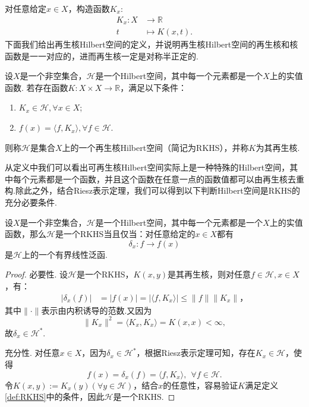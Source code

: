 \documentclass[../master.tex]{subfiles}
\begin{document}
对任意给定$x\in X$，构造函数$K_x$:
\begin{equation}\label{def:k_x}
    \begin{aligned}
K_x:X & \to\mathbb{R} \\
t & \mapsto K(x,t).
\end{aligned}
\end{equation}
下面我们给出再生核Hilbert空间的定义，并说明再生核Hilbert空间的再生核和核函数是一一对应的，进而再生核一定是对称半正定的.
\begin{definition}[再生核Hilbert空间]\label{def:RKHS}
    设$X$是一个非空集合，$\mathcal{H}$是一个Hilbert空间，其中每一个元素都是一个$X$上的实值函数. 若存在函数$K:X\times X\to\mathbb{R}$，满足以下条件：
    \begin{enumerate}
        \item $K_x\in\mathcal{H},\forall x\in X$;
        \item $f(x)=\langle f,K_x\rangle,\forall f\in\mathcal{H}$.
    \end{enumerate}
    则称$\mathcal{H}$是集合$X$上的一个再生核Hilbert空间（简记为RKHS），并称$K$为其再生核.
\end{definition}

从定义中我们可以看出可再生核Hilbert空间实际上是一种特殊的Hilbert空间，其中每个元素都是一个函数，并且这个函数在任意一点的函数值都可以由再生核去重构.除此之外，结合Riesz表示定理，我们可以得到以下判断Hilbert空间是RKHS的充分必要条件.

\begin{theorem}[RKHS的充要条件]
    设$X$是一个非空集合，$\mathcal{H}$是一个Hilbert空间，其中每一个元素都是一个$X$上的实值函数，那么$\mathcal{H}$是一个RKHS当且仅当：对任意给定的$x\in X$都有
    \begin{equation*}
        \delta_x:f\to f(x)
    \end{equation*}
    是$\mathcal{H}$上的一个有界线性泛函.
\end{theorem}

\begin{proof}
    必要性. 设$\mathcal{H}$是一个RKHS，$K(x,y)$是其再生核，则对任意$f\in\mathcal{H},x\in X$，有：
    \begin{align*}
        |\delta_x(f)|&=|f(x)|=|\langle f,K_x\rangle| \leq \|f\|\|K_x\|，
    \end{align*}
    其中$\|\cdot\|$表示由内积诱导的范数.又因为
    \begin{equation*}
        \|K_x\|^2=\langle K_x,K_x\rangle =K(x,x)<\infty,
    \end{equation*}
    故$\delta_x\in\mathcal{H}^*$.

    充分性. 对任意$x\in X$，因为$\delta_x\in\mathcal{H}^*$，根据Riesz表示定理可知，存在$K_x\in\mathcal{H}$，使得
    \begin{equation*}
        f(x)=\delta_x(f)=\langle f,K_x\rangle,~~\forall f\in\mathcal{H}.
    \end{equation*} 
    令$K(x,y):=K_x(y)(\forall y\in\mathcal{H})$，结合$x$的任意性，容易验证$K$满足定义\ref{def:RKHS}中的条件，因此$\mathcal{H}$是一个RKHS.
\end{proof}
\end{document}
